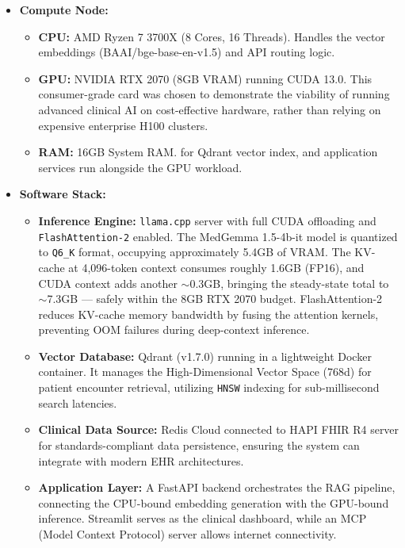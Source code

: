 \begin{itemize}
    \item \textbf{Compute Node:}
    \begin{itemize}
        \item \textbf{CPU:} AMD Ryzen 7 3700X (8 Cores, 16 Threads). Handles the vector embeddings (BAAI/bge-base-en-v1.5) and API routing logic.
        \item \textbf{GPU:} NVIDIA RTX 2070 (8GB VRAM) running CUDA 13.0. This consumer-grade card was chosen to demonstrate the viability of running advanced clinical AI on cost-effective hardware, rather than relying on expensive enterprise H100 clusters.
        \item \textbf{RAM:} 16GB System RAM. for Qdrant vector index, and application services run alongside the GPU workload.
    \end{itemize}

    \item \textbf{Software Stack:}
    \begin{itemize}
        \item \textbf{Inference Engine:} \texttt{llama.cpp} server with full CUDA offloading and \texttt{FlashAttention-2} enabled. The MedGemma 1.5-4b-it model is quantized to \texttt{Q6\_K} format, occupying approximately 5.4GB of VRAM. The KV-cache at 4,096-token context consumes roughly 1.6GB (FP16), and CUDA context adds another $\sim$0.3GB, bringing the steady-state total to $\sim$7.3GB — safely within the 8GB RTX 2070 budget. FlashAttention-2 reduces KV-cache memory bandwidth by fusing the attention kernels, preventing OOM failures during deep-context inference.
        \item \textbf{Vector Database:} Qdrant (v1.7.0) running in a lightweight Docker container. It manages the High-Dimensional Vector Space (768d) for patient encounter retrieval, utilizing \texttt{HNSW} indexing for sub-millisecond search latencies.
        \item \textbf{Clinical Data Source:} Redis Cloud connected to HAPI FHIR R4 server for standards-compliant data persistence, ensuring the system can integrate with modern EHR architectures.
        \item \textbf{Application Layer:} A FastAPI backend orchestrates the RAG pipeline, connecting the CPU-bound embedding generation with the GPU-bound inference. Streamlit serves as the clinical dashboard, while an MCP (Model Context Protocol) server allows internet connectivity.
    \end{itemize}
\end{itemize}

